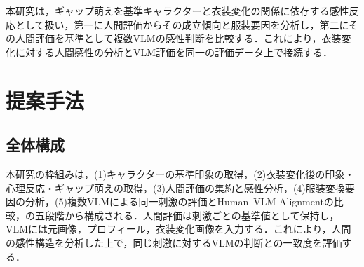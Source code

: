 \documentclass[a4j,twocolumn,11pt]{jarticle}
\begin{document}






本研究は，ギャップ萌えを基準キャラクターと衣装変化の関係に依存する感性反応として扱い，第一に人間評価からその成立傾向と服装要因を分析し，第二にその人間評価を基準として複数VLMの感性判断を比較する．これにより，衣装変化に対する人間感性の分析とVLM評価を同一の評価データ上で接続する．


\section{提案手法}
\subsection{全体構成}
本研究の枠組みは，(1)キャラクターの基準印象の取得，(2)衣装変化後の印象・心理反応・ギャップ萌えの取得，(3)人間評価の集約と感性分析，(4)服装変換要因の分析，(5)複数VLMによる同一刺激の評価とHuman--VLM Alignmentの比較，の五段階から構成される．人間評価は刺激ごとの基準値として保持し，VLMには元画像，プロフィール，衣装変化画像を入力する．これにより，人間の感性構造を分析した上で，同じ刺激に対するVLMの判断との一致度を評価する．

\end{document}
